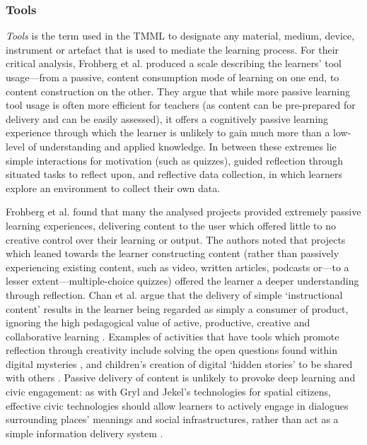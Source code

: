 \subsubsection{Tools}
\textit{Tools} is the term used in the TMML to designate any material, medium, device, instrument or artefact that is used to mediate the learning process. For their critical analysis, Frohberg et al. produced a scale describing the learners' tool usage---from a passive, content consumption mode of learning on one end, to content construction on the other. They argue that while more passive learning tool usage is often more efficient for teachers (as content can be pre-prepared for delivery and can be easily assessed), it offers a cognitively passive learning experience through which the learner is unlikely to gain much more than a low-level of understanding and applied knowledge. In between these extremes lie simple interactions for motivation (such as quizzes), guided reflection through situated tasks to reflect upon, and reflective data collection, in which learners explore an environment to collect their own data. 

Frohberg et al. found that many the analysed projects provided extremely passive learning experiences, delivering content to the user which offered little to no creative control over their learning or output. The authors noted that projects which leaned towards the learner constructing content (rather than passively experiencing existing content, such as video, written articles, podcasts or---to a lesser extent---multiple-choice quizzes) offered the learner a deeper understanding through reflection. Chan et al. argue that the delivery of simple `instructional content' results in the learner being regarded as simply a consumer of product, ignoring the high pedagogical value of active, productive, creative and collaborative learning \citep{Chan2006}. Examples of activities that have tools which promote reflection through creativity include solving the open questions found within digital mysteries \citep{Kharrufa2010}, and children’s creation of digital ‘hidden stories’ to be shared with others \citep{Wood2014}. Passive delivery of content is unlikely to provoke deep learning and civic engagement: as with Gryl and Jekel’s technologies for spatial citizens, effective civic technologies should allow learners to actively engage in dialogues surrounding places’ meanings and social infrastructures, rather than act as a simple information delivery system \citep{Gryl2012}.


